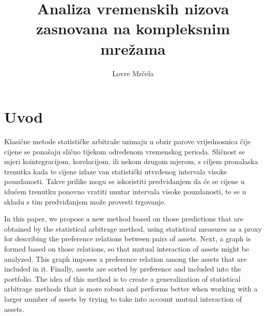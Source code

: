 \documentclass[lmodern, utf8, diplomski, numeric]{fer}
\begin{document}

\title{Analiza vremenskih nizova zasnovana na kompleksnim mrežama}

\author{Lovre Mrčela}

\maketitle

\izvornik

\zahvala{}

\tableofcontents

\chapter{Uvod}
  Klasične metode statističke arbitraže uzimaju u obzir parove vrijednosnica čije cijene se ponašaju slično tijekom određenom vremenskog perioda.
  Sličnost se mjeri kointegracijom, korelacijom, ili nekom drugom mjerom, s ciljem pronalaska trenutka kada te cijene izlaze van statistički utvrđenog intervala visoke pouzdanosti.
  Takve prilike mogu se iskoristiti predviđanjem da će se cijene u idućem trenutku ponovno vratiti unutar intervala visoke pouzdanosti, te se u skladu s tim predviđanjem može provesti trgovanje.
  
  In this paper, we propose a new method based on those predictions that are obtained by the statistical arbitrage method, using statistical measures as a proxy for describing the preference relations between pairs of assets.
  Next, a graph is formed based on those relations, so that mutual interaction of assets might be analyzed.
  This graph imposes a preference relation among the assets that are included in it.
  Finally, assets are sorted by preference and included into the portfolio.
  The idea of this method is to create a generalization of statistical arbitrage methods that is more robust and performs better when working with a larger number of assets by trying to take into account mutual interaction of assets.
\end{document}
